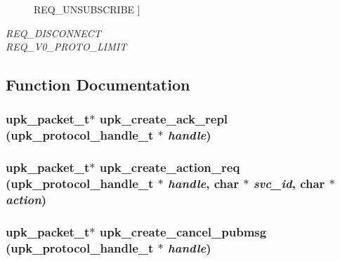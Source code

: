 \begin{Desc}
\begin{description}
{REQ\_\-UNSUBSCRIBE\label{protocol_8h_690dfb8bd28c162fdb504ef2efbde76935f3602b42848a33aefcc7c5e40f2192}
}]\item[{\em 
REQ\_\-DISCONNECT\label{protocol_8h_690dfb8bd28c162fdb504ef2efbde769a449c33c49ad4e9ac4fd4b45b977abe5}
}]\item[{\em 
REQ\_\-V0\_\-PROTO\_\-LIMIT\label{protocol_8h_690dfb8bd28c162fdb504ef2efbde769b4bdc9090da07f69d8c6bb175c4e959c}
}]\end{description}
\end{Desc}



\subsection{Function Documentation}
\subsubsection{\setlength{\rightskip}{0pt plus 5cm}\bf{upk\_\-packet\_\-t}$\ast$ upk\_\-create\_\-ack\_\-repl (\bf{upk\_\-protocol\_\-handle\_\-t} $\ast$ {\em handle})}\label{protocol_8h_28db76696f85ab5f0a0b612d27e05af0}


\subsubsection{\setlength{\rightskip}{0pt plus 5cm}\bf{upk\_\-packet\_\-t}$\ast$ upk\_\-create\_\-action\_\-req (\bf{upk\_\-protocol\_\-handle\_\-t} $\ast$ {\em handle}, char $\ast$ {\em svc\_\-id}, char $\ast$ {\em action})}\label{protocol_8h_f2852201ca8082631976a7da2c126693}


\subsubsection{\setlength{\rightskip}{0pt plus 5cm}\bf{upk\_\-packet\_\-t}$\ast$ upk\_\-create\_\-cancel\_\-pubmsg (\bf{upk\_\-protocol\_\-handle\_\-t} $\ast$ {\em handle})}\label{protocol_8h_5d3c48c62b1665f8466e792a5dd74322}


